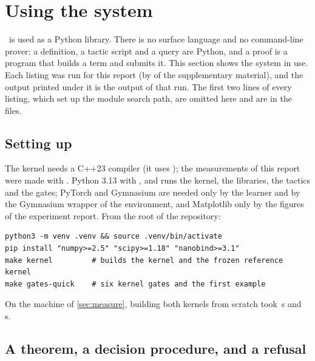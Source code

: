 \section{Using the system}\label{sec:usage}

\ITP\ is used as a Python library.
There is no surface language and no command-line prover: a definition, a tactic script and a query are Python, and a proof is a program that builds a term and submits it.
This section shows the system in use.
Each listing was run for this report (by  of the supplementary material), and the output printed under it is the output of that run.
The first two lines of every listing, which set up the module search path, are omitted here and are in the files.

\subsection{Setting up}\label{sec:setup}

The kernel needs a C++23 compiler (it uses ); the measurements of this report were made with \mCompiler.
Python 3.13 with ,  and  runs the kernel, the libraries, the tactics and the gates; PyTorch and Gymnasium are needed only by the learner and by the Gymnasium wrapper of the environment, and Matplotlib only by the figures of the experiment report.
From the root of the repository:
\begin{lstlisting}[style=out]
python3 -m venv .venv && source .venv/bin/activate
pip install "numpy>=2.5" "scipy>=1.18" "nanobind>=3.1"
make kernel         # builds the kernel and the frozen reference kernel
make gates-quick    # six kernel gates and the first example
\end{lstlisting}
On the machine of \cref{sec:measure}, building both kernels from scratch took \,s and  \gatesQuickS\,s.

\subsection{A theorem, a decision procedure, and a refusal}\label{sec:use-prove}

